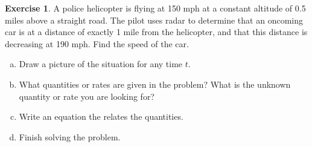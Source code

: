 \documentclass[11pt,reqno,final]{amsart}
\numberwithin{equation}{section}
\numberwithin{figure}{section}
\theoremstyle{definition} %
\newtheorem{exercise}[question]{Exercise}
\begin{document}
\begin{exercise}
        A police helicopter is flying at 150 mph at a constant altitude of 0.5 miles above a straight road.
        The pilot uses radar to determine that an oncoming car is at a distance of exactly 1 mile from the helicopter,
        and that this distance is decreasing at 190 mph.
        Find the speed of the car.
        \begin{enumerate}[(a)]
        \item Draw a picture of the situation for any time $t$.
        \item What quantities or rates are given in the problem? What is the unknown quantity or rate you are looking for?
        \item Write an equation the relates the quantities.
        \item Finish solving the problem.
        \end{enumerate}
\end{exercise}
\end{document}
